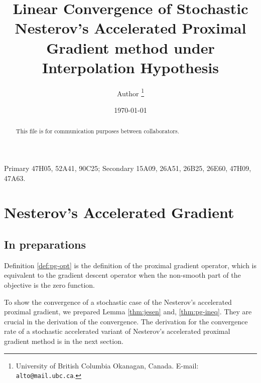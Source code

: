 \documentclass[12pt]{article}
\begin{document}
\title{{\selectfont Linear Convergence of Stochastic Nesterov's Accelerated Proximal Gradient method under Interpolation Hypothesis}}

\author{
    Author
    \thanks{
        University of British Columbia Okanagan,
        Canada. E-mail: \texttt{alto@mail.ubc.ca}.
    }
}

\date{\today}

\maketitle
{}

\begin{abstract} 
    This file is for communication purposes between collaborators. 

\end{abstract}

Primary 47H05, 52A41, 90C25; Secondary 15A09, 26A51, 26B25, 26E60, 47H09, 47A63.


\section{Nesterov's Accelerated Gradient}
    \subsection{In preparations}
        Definition \ref{def:pg-opt} is the definition of the proximal gradient operator, which is equivalent to the gradient descent operator when the non-smooth part of the objective is the zero function. 
        \par
        To show the convergence of a stochastic case of the Nesterov's accelerated proximal gradient, we prepared Lemma \ref{thm:jesen} and, \ref{thm:pg-ineq}. 
        They are crucial in the derivation of the convergence. 
        The derivation for the convergence rate of a stochastic accelerated variant of Nesterov's accelerated  proximal gradient method is in the next section. 
\end{document}
